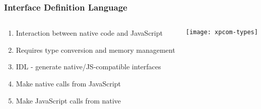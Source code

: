 \documentclass[
	notes=none,
	aspectratio=169
]{beamer}
\begin{document}

\begin{frame}
\frametitle{}

\begin{columns}[T]
\begin{column}[T]{0.5\textwidth}
\setlength{\parskip}{0.5em}

\vspace{0.7cm}



\end{column}
\begin{column}[T]{0.5\textwidth}
\setlength{\parskip}{0.5em}

\vspace{0.7cm}



\end{column}
\end{columns}

\end{frame}
\note{
}


\begin{frame}
\frametitle{Interface Definition Language}

\begin{columns}[T]
\begin{column}[T]{0.65\textwidth}
\setlength{\parskip}{0.5em}

\vspace{1.5cm}
\begin{enumerate}
\setlength{\parskip}{0.5em}
\item Interaction between native code and JavaScript
\item Requires type conversion and memory management
\item IDL - generate native/JS-compatible interfaces
\item Make native calls from JavaScript
\item Make JavaScript calls from native
\end{enumerate}

\end{column}
\begin{column}[T]{0.35\textwidth}
\setlength{\parskip}{0.5em}

\vspace{1.0cm}
\texttt{[image: xpcom-types]}

\end{column}
\end{columns}

\end{frame}
\note{
}
\end{document}
